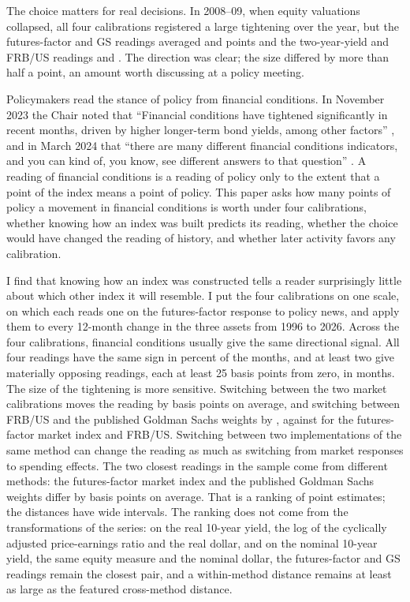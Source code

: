 \documentclass[11pt]{article}
\begin{document}
The choice matters for real decisions. In 2008--09, when equity valuations collapsed, all four calibrations registered a large tightening over the year, but the futures-factor and GS readings averaged  and  points and the two-year-yield and FRB/US readings  and . The direction was clear; the size differed by more than half a point, an amount worth discussing at a policy meeting.

Policymakers read the stance of policy from financial conditions. In November 2023 the Chair noted that ``Financial conditions have tightened significantly in recent months, driven by higher longer-term bond yields, among other factors'' \citep{powell2023}, and in March 2024 that ``there are many different financial conditions indicators, and you can kind of, you know, see different answers to that question'' \citep{powell2024}. A reading of financial conditions is a reading of policy only to the extent that a point of the index means a point of policy. This paper asks how many points of policy a movement in financial conditions is worth under four calibrations, whether knowing how an index was built predicts its reading, whether the choice would have changed the reading of history, and whether later activity favors any calibration.

I find that knowing how an index was constructed tells a reader surprisingly little about which other index it will resemble. I put the four calibrations on one scale, on which each reads one on the futures-factor response to policy news, and apply them to every 12-month change in the three assets from 1996 to 2026. Across the four calibrations, financial conditions usually give the same directional signal. All four readings have the same sign in  percent of the  months, and at least two give materially opposing readings, each at least 25 basis points from zero, in  months. The size of the tightening is more sensitive. Switching between the two market calibrations moves the reading by  basis points on average, and switching between FRB/US and the published Goldman Sachs weights by , against  for the futures-factor market index and FRB/US. Switching between two implementations of the same method can change the reading as much as switching from market responses to spending effects. The two closest readings in the sample come from different methods: the futures-factor market index and the published Goldman Sachs weights differ by  basis points on average. That is a ranking of point estimates; the distances have wide intervals. The ranking does not come from the transformations of the series: on the real 10-year yield, the log of the cyclically adjusted price-earnings ratio and the real dollar, and on the nominal 10-year yield, the same equity measure and the nominal dollar, the futures-factor and GS readings remain the closest pair, and a within-method distance remains at least as large as the featured cross-method distance.
\end{document}

